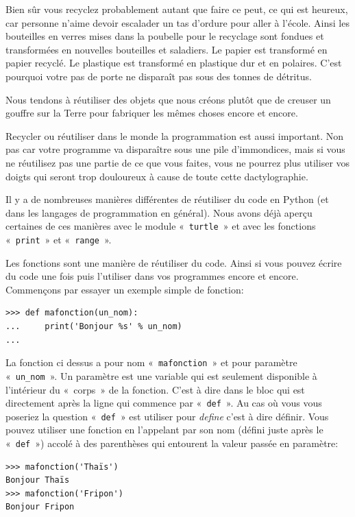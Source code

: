 Bien sûr vous recyclez probablement autant que faire ce peut, ce qui est heureux, car personne n'aime devoir escalader un tas d'ordure pour aller à l'école. Ainsi les bouteilles en verres mises dans la poubelle pour le recyclage sont fondues et transformées en nouvelles bouteilles et saladiers. Le papier est transformé en papier recyclé. Le plastique est transformé en plastique dur et en polaires. C'est pourquoi votre pas de porte ne disparaît pas sous des tonnes de détritus.

Nous tendons à réutiliser des objets que nous créons plutôt que de creuser un gouffre sur la Terre pour fabriquer les mêmes choses encore et encore.

Recycler ou réutiliser dans le monde la programmation est aussi important. Non pas car votre programme va disparaître sous une pile d'immondices, mais si vous ne réutilisez pas une partie de ce que vous faites, vous ne pourrez plus utiliser vos doigts qui seront trop douloureux à cause de toute cette dactylographie.

Il y a de nombreuses manières différentes de réutiliser du code en Python (et dans les langages de programmation en général). Nous avons déjà aperçu certaines de ces manières avec le module «~\texttt{turtle}~»  et avec les fonctions «~\texttt{print}~» et «~\texttt{range}~».

Les fonctions sont une manière de réutiliser du code. Ainsi si vous pouvez écrire du code une fois puis l'utiliser dans vos programmes encore et encore. Commençons par essayer un exemple simple de fonction:

\begin{Verbatim}[frame=single,rulecolor=\color{mbleu}, label=à taper]
>>> def mafonction(un_nom):
...     print('Bonjour %s' % un_nom)
...
\end{Verbatim}

La fonction ci dessus a pour nom «~\texttt{mafonction}~» et pour paramètre «~\texttt{un\_nom}~».
Un paramètre est une variable qui est seulement disponible à l'intérieur du «~corps~» de la fonction. 
C'est à dire dans le bloc qui est directement après la ligne qui commence par «~\texttt{def}~». Au cas où vous vous poseriez la question «~\texttt{def}~»  est utiliser pour \emph{define} c'est à dire définir. Vous pouvez utiliser une fonction en l'appelant par son nom (défini juste après le «~\texttt{def}~») accolé à des parenthèses  qui entourent la valeur passée en paramètre:

\begin{Verbatim}[frame=single,rulecolor=\color{mbleu}, label=à taper]
>>> mafonction('Thaïs')
Bonjour Thaïs
>>> mafonction('Fripon')
Bonjour Fripon
\end{Verbatim}

